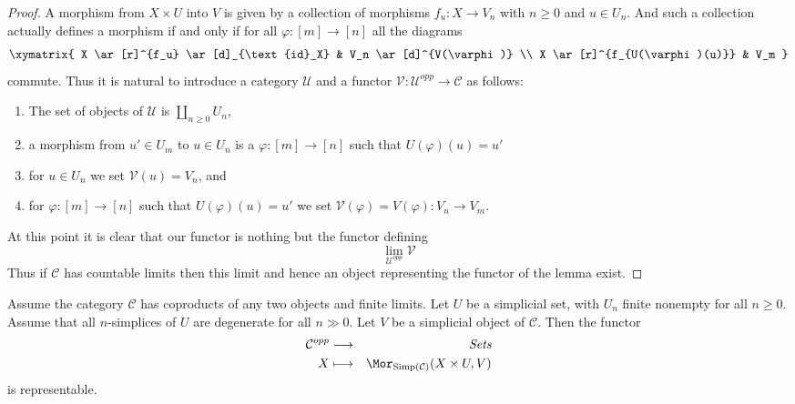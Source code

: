 \begin{proof}
A morphism from $X \times U$ into $V$ is given by a collection
of morphisms $f_u : X \to V_n$ with $n \geq 0$ and $u \in U_n$.
And such a collection actually defines a morphism if and only
if for all $\varphi : [m] \to [n]$ all the diagrams
$$
\xymatrix{
X \ar[r]^{f_u} \ar[d]_{\text{id}_X} & V_n \ar[d]^{V(\varphi)} \\
X \ar[r]^{f_{U(\varphi)(u)}} & V_m
}
$$
commute. Thus it is natural to introduce a category
$\mathcal{U}$ and a functor
$\mathcal{V} : \mathcal{U}^{opp} \to \mathcal{C}$
as follows:
\begin{enumerate}
\item The set of objects of $\mathcal{U}$ is
$\coprod_{n \geq 0} U_n$,
\item a morphism from $u' \in U_m$ to $u \in U_n$
is a $\varphi : [m] \to [n]$ such that $U(\varphi)(u) = u'$
\item for $u \in U_n$ we set $\mathcal{V}(u) = V_n$, and
\item for $\varphi : [m] \to [n]$ such that $U(\varphi)(u) = u'$
we set $\mathcal{V}(\varphi) = V(\varphi) : V_n \to V_m$.
\end{enumerate}
At this point it is clear that our functor is nothing but the
functor defining
$$
\lim_{\mathcal{U}^{opp}} \mathcal{V}
$$
Thus if $\mathcal{C}$ has countable limits then this limit
and hence an object representing the functor of the lemma
exist.
\end{proof}

\begin{lemma}
\label{lemma-exists-hom-0-from-simplicial-set-finite}
Assume the category $\mathcal{C}$
has coproducts of any two objects and finite
limits. Let $U$ be a simplicial set, with $U_n$ finite nonempty
for all $n \geq 0$. Assume that all $n$-simplices
of $U$ are degenerate for all $n \gg 0$.
Let $V$ be a simplicial object of $\mathcal{C}$.
Then the functor
\begin{eqnarray*}
\mathcal{C}^{opp} & \longrightarrow & \textit{Sets} \\
X
& \longmapsto &
\Mor_{\text{Simp}(\mathcal{C})}(X \times U, V)
\end{eqnarray*}
is representable.
\end{lemma}


